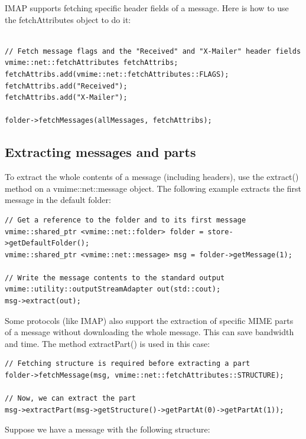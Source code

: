 IMAP supports fetching specific header fields of a message. Here is how to use
the {\vcode fetchAttributes} object to do it:

\begin{lstlisting}[caption={Using fetchAttributes object to fetch specific header fields of a message}]

// Fetch message flags and the "Received" and "X-Mailer" header fields
vmime::net::fetchAttributes fetchAttribs;
fetchAttribs.add(vmime::net::fetchAttributes::FLAGS);
fetchAttribs.add("Received");
fetchAttribs.add("X-Mailer");

folder->fetchMessages(allMessages, fetchAttribs);
\end{lstlisting}


\subsection{Extracting messages and parts}

To extract the whole contents of a message (including headers), use the
{\vcode extract()} method on a {\vcode vmime::net::message} object. The
following example extracts the first message in the default folder:

\begin{lstlisting}[caption={Extracting messages}]
// Get a reference to the folder and to its first message
vmime::shared_ptr <vmime::net::folder> folder = store->getDefaultFolder();
vmime::shared_ptr <vmime::net::message> msg = folder->getMessage(1);

// Write the message contents to the standard output
vmime::utility::outputStreamAdapter out(std::cout);
msg->extract(out);
\end{lstlisting}

Some protocols (like IMAP) also support the extraction of specific MIME parts
of a message without downloading the whole message. This can save bandwidth
and time. The method {\vcode extractPart()} is used in this case:

\begin{lstlisting}[caption={Extracting a specific MIME part of a message}]
// Fetching structure is required before extracting a part
folder->fetchMessage(msg, vmime::net::fetchAttributes::STRUCTURE);

// Now, we can extract the part
msg->extractPart(msg->getStructure()->getPartAt(0)->getPartAt(1));
\end{lstlisting}

Suppose we have a message with the following structure:

